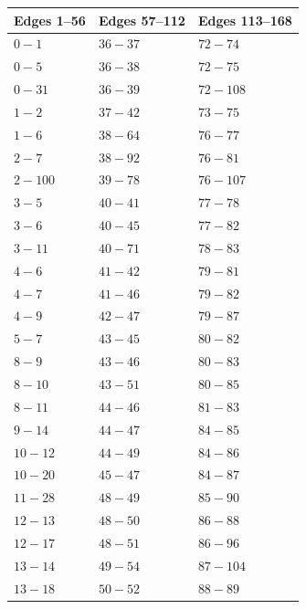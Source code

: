 \documentclass[11pt]{article}
\begin{document}
\begin{center}
\scriptsize
\renewcommand{\arraystretch}{0.96}
\begin{longtable}{@{}lll@{}}
\toprule
Edges 1--56 & Edges 57--112 & Edges 113--168\\
\midrule
\endhead
\bottomrule
\endlastfoot
$0\!\!-\!\!1$ & $36\!\!-\!\!37$ & $72\!\!-\!\!74$ \\
$0\!\!-\!\!5$ & $36\!\!-\!\!38$ & $72\!\!-\!\!75$ \\
$0\!\!-\!\!31$ & $36\!\!-\!\!39$ & $72\!\!-\!\!108$ \\
$1\!\!-\!\!2$ & $37\!\!-\!\!42$ & $73\!\!-\!\!75$ \\
$1\!\!-\!\!6$ & $38\!\!-\!\!64$ & $76\!\!-\!\!77$ \\
$2\!\!-\!\!7$ & $38\!\!-\!\!92$ & $76\!\!-\!\!81$ \\
$2\!\!-\!\!100$ & $39\!\!-\!\!78$ & $76\!\!-\!\!107$ \\
$3\!\!-\!\!5$ & $40\!\!-\!\!41$ & $77\!\!-\!\!78$ \\
$3\!\!-\!\!6$ & $40\!\!-\!\!45$ & $77\!\!-\!\!82$ \\
$3\!\!-\!\!11$ & $40\!\!-\!\!71$ & $78\!\!-\!\!83$ \\
$4\!\!-\!\!6$ & $41\!\!-\!\!42$ & $79\!\!-\!\!81$ \\
$4\!\!-\!\!7$ & $41\!\!-\!\!46$ & $79\!\!-\!\!82$ \\
$4\!\!-\!\!9$ & $42\!\!-\!\!47$ & $79\!\!-\!\!87$ \\
$5\!\!-\!\!7$ & $43\!\!-\!\!45$ & $80\!\!-\!\!82$ \\
$8\!\!-\!\!9$ & $43\!\!-\!\!46$ & $80\!\!-\!\!83$ \\
$8\!\!-\!\!10$ & $43\!\!-\!\!51$ & $80\!\!-\!\!85$ \\
$8\!\!-\!\!11$ & $44\!\!-\!\!46$ & $81\!\!-\!\!83$ \\
$9\!\!-\!\!14$ & $44\!\!-\!\!47$ & $84\!\!-\!\!85$ \\
$10\!\!-\!\!12$ & $44\!\!-\!\!49$ & $84\!\!-\!\!86$ \\
$10\!\!-\!\!20$ & $45\!\!-\!\!47$ & $84\!\!-\!\!87$ \\
$11\!\!-\!\!28$ & $48\!\!-\!\!49$ & $85\!\!-\!\!90$ \\
$12\!\!-\!\!13$ & $48\!\!-\!\!50$ & $86\!\!-\!\!88$ \\
$12\!\!-\!\!17$ & $48\!\!-\!\!51$ & $86\!\!-\!\!96$ \\
$13\!\!-\!\!14$ & $49\!\!-\!\!54$ & $87\!\!-\!\!104$ \\
$13\!\!-\!\!18$ & $50\!\!-\!\!52$ & $88\!\!-\!\!89$ \\

\end{longtable}
\end{center}
\end{document}

